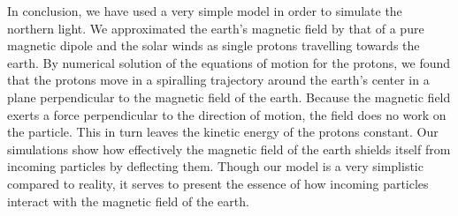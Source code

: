 In conclusion, we have used a very simple model in order to simulate the northern light. We approximated the earth's magnetic field by that of a pure magnetic dipole and the solar winds as single protons travelling towards the earth. By numerical solution of the equations of motion for the protons, we found that the protons move in a spiralling trajectory around the earth's center in a plane perpendicular to the magnetic field of the earth. Because the magnetic field exerts a force perpendicular to the direction of motion, the field does no work on the particle. This in turn leaves the kinetic energy of the protons constant. Our simulations show how effectively the magnetic field of the earth shields itself from incoming particles by deflecting them. Though our model is a very simplistic compared to reality, it serves to present the essence of how incoming particles interact with the magnetic field of the earth.